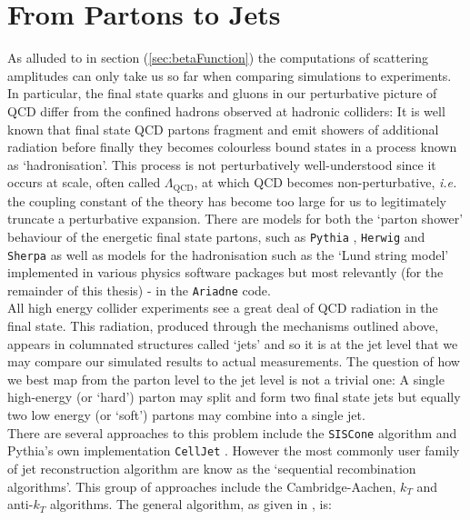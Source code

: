 \section{From Partons to Jets}

	As alluded to in section (\ref{sec:betaFunction}) the computations of scattering amplitudes can only take us so far
	when comparing simulations to experiments.  In particular, the final state quarks and gluons in our perturbative
	picture of QCD differ from the confined hadrons observed at hadronic colliders:  It is well known that final state
	QCD partons fragment and emit showers of additional radiation before finally they becomes colourless bound states
	in a process known as `hadronisation'.  This process is not perturbatively well-understood since it occurs at scale,
	often called $\Lambda_{\text{QCD}}$, at which QCD becomes non-perturbative, \emph{i.e.} the coupling constant of the
	theory has become too large for us to legitimately truncate a perturbative expansion.  There are models for both
	the `parton shower' behaviour of the energetic final state partons, such as \texttt{Pythia} \cite{Sjostrand:2007gs},
	\texttt{Herwig} \cite{Corcella:2000bw} and \texttt{Sherpa} \cite{Hoche:2014kca} as well as models for the hadronisation
	such as the `Lund string model' \cite{Andersson:2002ap} implemented in various physics software packages but most
	relevantly (for the remainder of this thesis) - in the \texttt{Ariadne} code.\\All high energy collider experiments
	see a great deal of QCD radiation in the final state.  This radiation, produced through the mechanisms outlined above,
	appears in columnated structures called `jets' and so it is at the jet level that we may compare our simulated results
	to actual measurements. The question of how we best map from the parton level to the jet level is not a trivial
	one:  A single high-energy (or `hard') parton may split and form two final state jets but equally two low energy (or
	`soft') partons may combine into a single jet.\\There are several approaches to this problem include the \texttt{SISCone}
	algorithm \cite{Salam:2007xv} and Pythia's own implementation \texttt{CellJet} \cite{Sjostrand:2000wi}. However the
	most commonly user family of jet reconstruction algorithm are know as the `sequential recombination algorithms'.
	This group of approaches include the Cambridge-Aachen, $k_T$ and anti-$k_T$ algorithms. The general algorithm, as
	given in \cite{Cacciari:2008gp}, is:

